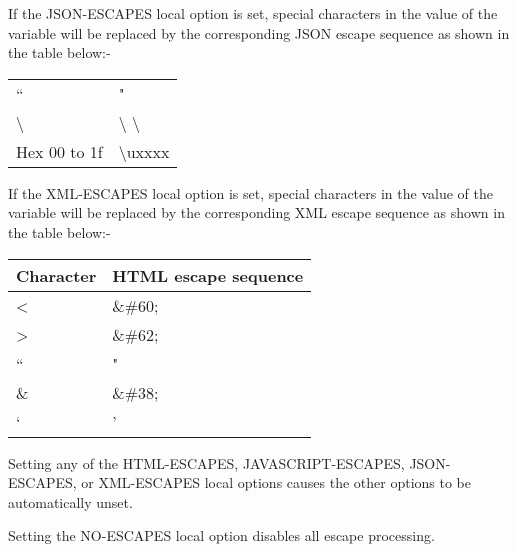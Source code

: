 \documentclass[letterpaper,10pt,english]{sphinxmanual}
\begin{document}
If the JSON-ESCAPES local option is set, special characters in the value of the variable will be replaced by the corresponding JSON escape sequence as shown in the table below:-


\begin{savenotes}\sphinxattablestart
\centering
\begin{tabulary}{\linewidth}[t]{|T|T|}
\hline
{}\relax &\relax \\
\hline
“
&
"
\\
\hline
\textbackslash{}
&
\textbackslash{} \textbackslash{}
\\
\hline
Hex 00 to 1f
&
\textbackslash{}uxxxx
\\
\hline
\end{tabulary}
\par
\sphinxattableend\end{savenotes}

If the XML-ESCAPES local option is set, special characters in the value of the variable will be replaced by the corresponding XML escape sequence as shown in the table below:-


\begin{savenotes}\sphinxattablestart
\centering
\begin{tabulary}{\linewidth}[t]{|T|T|}
\hline

Character
&
HTML escape sequence
\\
\hline
\textless{}
&
\&\#60;
\\
\hline
\textgreater{}
&
\&\#62;
\\
\hline
“
&
"
\\
\hline
\&
&
\&\#38;
\\
\hline
‘
&
'
\\
\hline
\end{tabulary}
\par
\sphinxattableend\end{savenotes}

Setting any of the HTML-ESCAPES, JAVASCRIPT-ESCAPES, JSON-ESCAPES, or XML-ESCAPES local options causes the other options to be automatically unset.

Setting the NO-ESCAPES local option disables all escape processing.


\begin{sphinxVerbatim}[commandchars=\\\{\}]
 
\end{sphinxVerbatim}
\end{document}
